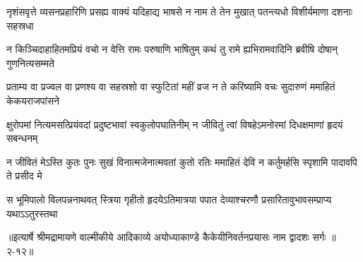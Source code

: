 \twolineshloka
{नृशंसवृत्ते व्यसनप्रहारिणि प्रसह्य वाक्यं यदिहाद्य भाषसे}
{न नाम ते तेन मुखात् पतन्त्यधो विशीर्यमाणा दशनाः सहस्रधा} %

\twolineshloka
{न किञ्चिदाहाहितमप्रियं वचो न वेत्ति रामः परुषाणि भाषितुम्}
{कथं तु रामे ह्यभिरामवादिनि ब्रवीषि दोषान् गुणनित्यसम्मते} %

\twolineshloka
{प्रताम्य वा प्रज्वल वा प्रणश्य वा सहस्रशो वा स्फुटितां महीं व्रज}
{न ते करिष्यामि वचः सुदारुणं ममाहितं केकयराजपांसने} %

\twolineshloka
{क्षुरोपमां नित्यमसत्प्रियंवदां प्रदुष्टभावां स्वकुलोपघातिनीम्}
{न जीवितुं त्वां विषहेऽमनोरमां दिधक्षमाणां हृदयं सबन्धनम्} %

\twolineshloka
{न जीवितं मेऽस्ति कुतः पुनः सुखं विनात्मजेनात्मवतां कुतो रतिः}
{ममाहितं देवि न कर्तुमर्हसि स्पृशामि पादावपि ते प्रसीद मे} %

\twolineshloka
{स भूमिपालो विलपन्ननाथवत् स्त्रिया गृहीतो हृदयेऽतिमात्रया}
{पपात देव्याश्चरणौ प्रसारितावुभावसम्प्राप्य यथाऽऽतुरस्तथा} %


॥इत्यार्षे श्रीमद्रामायणे वाल्मीकीये आदिकाव्ये अयोध्याकाण्डे कैकेयीनिवर्तनप्रयासः नाम द्वादशः सर्गः ॥२-१२॥
